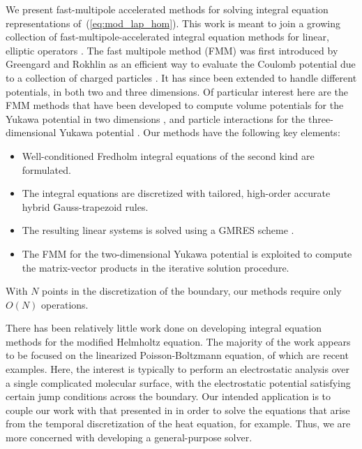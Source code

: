 \documentclass[preprint,12pt]{elsarticle}
\newcommand{\eqr}[1]{~(\ref{#1})}
\begin{document}
We present fast-multipole accelerated methods for solving integral equation representations of\eqr{eq:mod_lap_hom}. 
This work is meant to join a growing collection of fast-multipole-accelerated integral equation methods for linear, elliptic operators \cite{modified:helmholtz,mult:conn,poisson:solver:accuracy,stokes:flow}.
The fast multipole method (FMM) was first introduced by Greengard and Rokhlin as an efficient way to evaluate the Coulomb potential due to a collection of charged particles \cite{CGR}. 
It has since been extended to handle different potentials, in both two and three dimensions. 
Of particular interest here are the FMM methods that have been developed to compute volume potentials for the Yukawa potential in two dimensions \cite{modified:helmholtz}, and particle interactions for the three-dimensional Yukawa potential \cite{screened_coulomb}. 
Our methods have the following key elements:
\begin{itemize}
\item Well-conditioned Fredholm integral equations of the second kind are formulated.
\item The integral equations are discretized with tailored, high-order accurate hybrid Gauss-trapezoid rules.
\item The resulting linear systems is solved using a GMRES scheme \cite{SAAD}.
\item The FMM for the two-dimensional Yukawa potential is exploited to compute the matrix-vector products in the iterative solution procedure.
\end{itemize}
With $N$ points in the discretization of the boundary, our methods require only $O(N)$ operations.

There has been relatively little work done on developing integral equation methods for the modified Helmholtz equation.
The majority of the work appears to be focused on the linearized Poisson-Boltzmann equation, of which \cite{KUO_et_al, Lu_et_al, Lu_et_al2} are recent examples. 
Here, the interest is typically to perform an electrostatic analysis over a single complicated molecular surface, with the electrostatic potential satisfying certain jump conditions across the boundary. 
Our intended application is to couple our work with that presented in \cite{modified:helmholtz} in order to solve the equations that arise from the temporal discretization
of the heat equation, for example.
Thus, we are more concerned with developing a general-purpose solver. 
\end{document}
